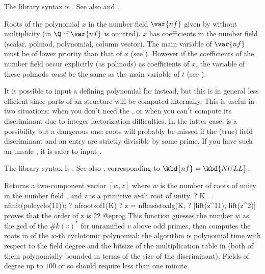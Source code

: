 The library syntax is .
See also 
and .

\label{se:nfroots}
Roots of the polynomial $x$ in the
number field $\var{nf}$ given by  without multiplicity (in $\Q$
if $\var{nf}$ is omitted). $x$ has coefficients in the number field (scalar,
polmod, polynomial, column vector). The main variable of $\var{nf}$ must be
of lower priority than that of $x$ (see ). However if the
coefficients of the number field occur explicitly (as polmods) as
coefficients of $x$, the variable of these polmods \emph{must} be the same as
the main variable of $t$ (see ).

It is possible to input a defining polynomial for 
instead, but this is in general less efficient since parts of an 
structure will be computed internally. This is useful in two situations: when
you don't need the , or when you can't compute its discriminant due
to integer factorization difficulties. In the latter case,  is
a possibility but a dangerous one: roots will probably be missed if the
(true) field discriminant and an  entry are strictly divisible
by some prime. If you have such an unsafe , it is safer to input
.

The library syntax is .
See also ,
corresponding to $\kbd{nf} = \kbd{NULL}$.

\label{se:nfrootsof1}
Returns a two-component vector $[w,z]$ where $w$ is the number of roots of
unity in the number field , and $z$ is a primitive $w$-th root
of unity.
\bprog
? K = nfinit(polcyclo(11));
? nfrootsof1(K)
? z = nfbasistoalg(K, %
? [lift(z^11), lift(z^2)]     \\ proves that the order of z is 22
@eprog
This function guesses the number $w$ as the gcd of the $\#k(v)^*$ for
unramified $v$ above odd primes, then computes the roots in 
of the $w$-th cyclotomic polynomial: the algorithm is polynomial time with
respect to the field degree and the bitsize of the multiplication table in
 (both of them polynomially bounded in terms of the size of the
discriminant). Fields of degree up to $100$ or so should require less than
one minute.

